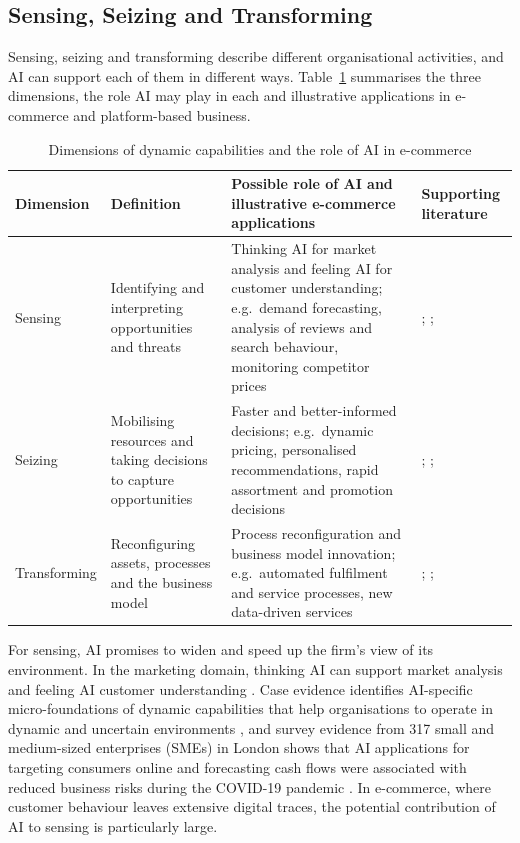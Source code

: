 \subsection{Sensing, Seizing and Transforming}
\label{sec:ssr}

Sensing, seizing and transforming describe different organisational activities, and AI can support each of them in different ways. Table~\ref{tab:dcai} summarises the three dimensions, the role AI may play in each and illustrative applications in e-commerce and platform-based business.

\begin{table}[htbp]
\centering
\caption{Dimensions of dynamic capabilities and the role of AI in e-commerce}
\label{tab:dcai}
\footnotesize
\renewcommand{\arraystretch}{1.1}\setlength{\tabcolsep}{4pt}
\begin{tabularx}{\textwidth}{|>{\raggedright\arraybackslash}p{2.15cm}|>{\raggedright\arraybackslash}p{3.1cm}|>{\raggedright\arraybackslash}X|>{\raggedright\arraybackslash}p{2.9cm}|}
\hline
\textbf{Dimension} & \textbf{Definition} & \textbf{Possible role of AI and illustrative e-commerce applications} & \textbf{Supporting literature} \\
\hline
Sensing & Identifying and interpreting opportunities and threats & Thinking AI for market analysis and feeling AI for customer understanding; e.g.\ demand forecasting, analysis of reviews and search behaviour, monitoring competitor prices & \textcite{teece2007}; \textcite{huang2021}; \textcite{mikalef2021b2b} \\ \hline
Seizing & Mobilising resources and taking decisions to capture opportunities & Faster and better-informed decisions; e.g.\ dynamic pricing, personalised recommendations, rapid assortment and promotion decisions & \textcite{teece2007}; \textcite{neiroukh2025}; \textcite{chen2022} \\ \hline
Transforming & Reconfiguring assets, processes and the business model & Process reconfiguration and business model innovation; e.g.\ automated fulfilment and service processes, new data-driven services & \textcite{teece2007}; \textcite{wambataguimdje2020}; \textcite{sjodin2021} \\
\hline
\end{tabularx}
\end{table}

For sensing, AI promises to widen and speed up the firm's view of its environment. In the marketing domain, thinking AI can support market analysis and feeling AI customer understanding \parencite{huang2021}. Case evidence identifies AI-specific micro-foundations of dynamic capabilities that help organisations to operate in dynamic and uncertain environments \parencite{mikalef2021b2b}, and survey evidence from 317 small and medium-sized enterprises (SMEs) in London shows that AI applications for targeting consumers online and forecasting cash flows were associated with reduced business risks during the COVID-19 pandemic \parencite{drydakis2022}. In e-commerce, where customer behaviour leaves extensive digital traces, the potential contribution of AI to sensing is particularly large.

